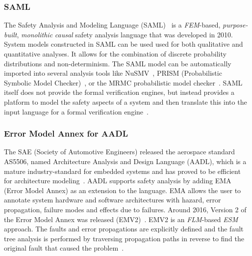 \subsubsection{SAML}
The Safety Analysis and Modeling Language (SAML)~\cite{Gudemann:2010:FQQ:1909626.1909813} is a {\em FEM}-based, {\em purpose-built}, {\em monolithic} {\em causal} safety analysis language that was developed in 2010.  System models constructed in SAML can be used used for both qualitative and quantitative analyses. It allows for the combination of discrete probability distributions and non-determinism. The SAML model can be automatically imported into several analysis tools like NuSMV~\cite{Cimatti2000}, PRISM (Probabilistic Symbolic Model Checker)~\cite{CAV2011:KwNoPa}, or the MRMC probabilistic model checker~\cite{Katoen:2005:MRM:1114692.1115230}. SAML itself does not provide the formal verification engines, but instead provides a platform to model the safety aspects of a system and then translate this into the input language for a formal verification engine~\cite{Gudemann:2010:FQQ:1909626.1909813}.

\subsubsection{Error Model Annex for AADL}
The SAE (Society of Automotive Engineers) released the
aerospace standard AS5506, named Architecture Analysis and Design Language (AADL), which is a mature industry-standard for embedded systems and has proved to be efficient for architecture modeling~\cite{aerospace2012sae,liu2016research}. AADL supports safety analysis by adding EMA (Error Model Annex) as an extension to the language. EMA allows the user to annotate system hardware and software architectures with hazard, error propagation, failure modes and effects due to failures. Around 2016, Version 2 of the Error Model Annex was released (EMV2)~\cite{EMV2}. EMV2 is an {\em FLM}-based {\em ESM} approach. The faults and error propagations are explicitly defined and the fault tree analysis is performed by traversing propagation paths in reverse to find the original fault that caused the problem~\cite{feiler2017automated}. 


